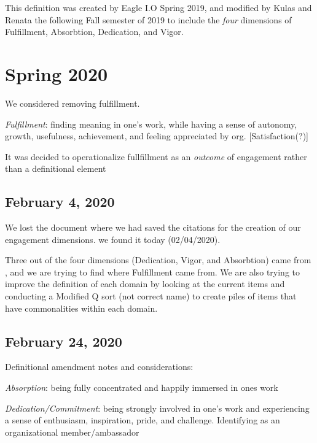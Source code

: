 \documentclass[
]{book}
\begin{document}
This definition was created by Eagle I.O Spring 2019, and modified by Kulas and Renata the following Fall semester of 2019 to include the \emph{four} dimensions of Fulfillment, Absorbtion, Dedication, and Vigor.

\hypertarget{spring-2020}{%
\section{Spring 2020}\label{spring-2020}}

We considered removing fulfillment.

\emph{Fulfillment}: finding meaning in one's work, while having a sense of autonomy, growth, usefulness, achievement, and feeling appreciated by org. {[}Satisfaction(?){]}

It was decided to operationalize fullfillment as an \emph{outcome} of engagement rather than a definitional element

\hypertarget{february-4-2020}{%
\subsection{February 4, 2020}\label{february-4-2020}}

We lost the document where we had saved the citations for the creation of our engagement dimensions. we found it today (02/04/2020).

Three out of the four dimensions (Dedication, Vigor, and Absorbtion) came from \citet{schaufeli_measurement_2002}, and we are trying to find where Fulfillment came from. We are also trying to improve the definition of each domain by looking at the current items and conducting a Modified Q sort (not correct name) to create piles of items that have commonalities within each domain.

\hypertarget{february-24-2020}{%
\subsection{February 24, 2020}\label{february-24-2020}}

Definitional amendment notes and considerations:

\emph{Absorption}: being fully concentrated and happily immersed in ones work \citep[time passes quickly and has difficulty detaching from ones work;][]{schaufeli_measurement_2002}

\emph{Dedication/Commitment}: being strongly involved in one's work and experiencing a sense of enthusiasm, inspiration, pride, and challenge. \citep{schaufeli_measurement_2002} Identifying as an organizational member/ambassador
\end{document}
